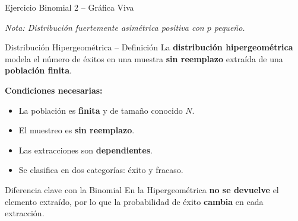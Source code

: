 \documentclass[10pt]{beamer}
\begin{document}
\begin{frame}{Ejercicio Binomial 2 -- Gráfica Viva}
\begin{center}
\end{center}
\footnotesize
\textit{Nota: Distribución fuertemente asimétrica positiva con $p$ pequeño.}
\end{frame}


\begin{frame}{Distribución Hipergeométrica -- Definición}
\justifying
La \textbf{distribución hipergeométrica} modela el número de éxitos en una muestra \textbf{sin reemplazo} extraída de una \textbf{población finita}.

\vspace{0.3cm}
\textbf{Condiciones necesarias:}
\begin{itemize}
    \item La población es \textbf{finita} y de tamaño conocido $N$.
    \item El muestreo es \textbf{sin reemplazo}.
    \item Las extracciones son \textbf{dependientes}.
    \item Se clasifica en dos categorías: éxito y fracaso.
\end{itemize}

\vspace{0.2cm}
\begin{alertblock}{Diferencia clave con la Binomial}
En la Hipergeométrica \textbf{no se devuelve} el elemento extraído, por lo que la probabilidad de éxito \textbf{cambia} en cada extracción.
\end{alertblock}
\end{frame}
\end{document}
